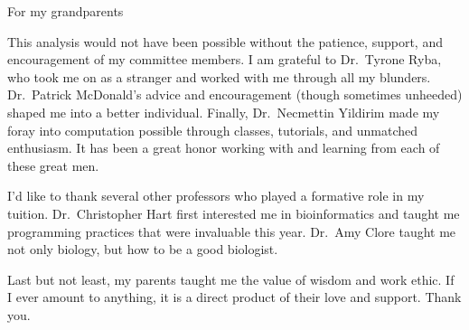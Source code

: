 
\begin{dedication}
For my grandparents
\end{dedication}

\begin{acknowledgements}
This analysis would not have been possible without the patience, support, and encouragement of my committee members.  I am grateful to
Dr.\ Tyrone Ryba, who took me on as a stranger and worked with me through all my blunders.  Dr.\ Patrick McDonald's advice and
encouragement (though sometimes unheeded) shaped me into a better individual.  Finally, Dr.\ Necmettin Yildirim made my foray into
computation possible through classes, tutorials, and unmatched enthusiasm.  It has been a great honor working with and learning from
each of these great men.

I'd like to thank several other professors who played a formative role in my tuition.  Dr.\ Christopher Hart first interested me in
bioinformatics and taught me programming practices that were invaluable this year.  Dr.\ Amy Clore taught me not only biology, but how
to be a good biologist.

Last but not least, my parents taught me the value of wisdom and work ethic.  If I ever amount to anything, it is a direct product of
their love and support.  Thank you.
\end{acknowledgements}
